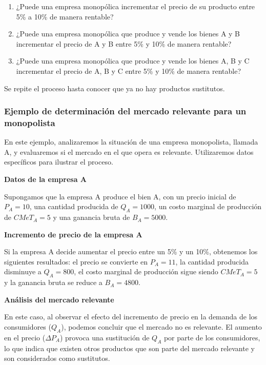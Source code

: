 \documentclass[
  a4paper,
]{article}
\theoremstyle{definition}
\theoremstyle{remark}
\begin{document}
\begin{enumerate}
\def\labelenumi{\arabic{enumi}.}
\item
  ¿Puede una empresa monopólica incrementar el precio de su producto
  entre 5\% a 10\% de manera rentable?
\item
  ¿Puede una empresa monopólica que produce y vende los bienes A y B
  incrementar el precio de A y B entre 5\% y 10\% de manera rentable?
\item
  ¿Puede una empresa monopólica que produce y vende los bienes A, B y C
  incrementar el precio de A, B y C entre 5\% y 10\% de manera rentable?
\end{enumerate}

Se repite el proceso hasta conocer que ya no hay productos sustitutos.

\hypertarget{ejemplo-de-determinaciuxf3n-del-mercado-relevante-para-un-monopolista}{%
\subsubsection{Ejemplo de determinación del mercado relevante para un
monopolista}\label{ejemplo-de-determinaciuxf3n-del-mercado-relevante-para-un-monopolista}}

En este ejemplo, analizaremos la situación de una empresa monopolista,
llamada A, y evaluaremos si el mercado en el que opera es relevante.
Utilizaremos datos específicos para ilustrar el proceso.

\textbf{Datos de la empresa A}

Supongamos que la empresa A produce el bien A, con un precio inicial de
\(P_A = 10\), una cantidad producida de \(Q_A = 1000\), un costo
marginal de producción de \(CMeT_A = 5\) y una ganancia bruta de
\(B_A = 5000\).

\textbf{Incremento de precio de la empresa A}

Si la empresa A decide aumentar el precio entre un 5\% y un 10\%,
obtenemos los siguientes resultados: el precio se convierte en
\(P_A = 11\), la cantidad producida disminuye a \(Q_A = 800\), el costo
marginal de producción sigue siendo \(CMeT_A = 5\) y la ganancia bruta
se reduce a \(B_A = 4800\).

\textbf{Análisis del mercado relevante}

En este caso, al observar el efecto del incremento de precio en la
demanda de los consumidores (\(Q_A\)), podemos concluir que el mercado
no es relevante. El aumento en el precio (\(\Delta P_A\)) provoca una
sustitución de \(Q_A\) por parte de los consumidores, lo que indica que
existen otros productos que son parte del mercado relevante y son
considerados como sustitutos.
\end{document}
